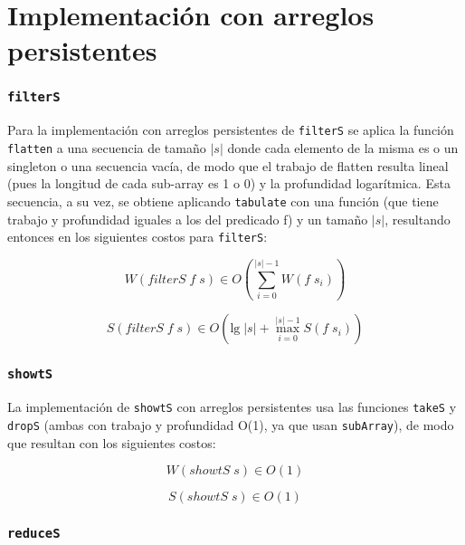 \documentclass[a4paper,10pt]{article}
\begin{document}
\part*{Implementación con arreglos persistentes}

\section*{\texttt{filterS}}

Para la implementación con arreglos persistentes de \texttt{filterS} se aplica
la función \texttt{flatten} a una secuencia de tamaño $\vert s \vert$ donde cada
elemento de la misma es o un singleton o una secuencia vacía, de modo que el
trabajo de flatten resulta lineal (pues la longitud de cada sub-array es 1 o 0)
y la profundidad logarítmica. Esta secuencia, a su vez, se obtiene aplicando
\texttt{tabulate} con una función (que tiene trabajo y profundidad iguales a
los del predicado f) y un tamaño $\vert s \vert$, resultando entonces en los
siguientes costos para \texttt{filterS}:

\begin{equation*}
    W \left( filterS \; f \; s \right) \in
    O \left( \sum_{i=0}^{\vert s \vert -1} W(f \; s_i) \right)
\end{equation*}

\begin{equation*}
    S \left( filterS \; f \; s \right) \in
    O \left( \text{lg} \; \vert s \vert + \max_{i=0}^{\vert s \vert -1} S(f \; s_i) \right)
\end{equation*}


\section*{\texttt{showtS}}

La implementación de \texttt{showtS} con arreglos persistentes usa las funciones
\texttt{takeS} y \texttt{dropS} (ambas con trabajo y profundidad O(1), ya que usan
\texttt{subArray}), de modo que resultan con los siguientes costos:

\begin{equation*}
    W \left( showtS \; s \right) \in
    O \left( 1 \right)
\end{equation*}

\begin{equation*}
    S \left( showtS \; s \right) \in
    O \left( 1 \right)
\end{equation*}


\section*{\texttt{reduceS}}
\end{document}
